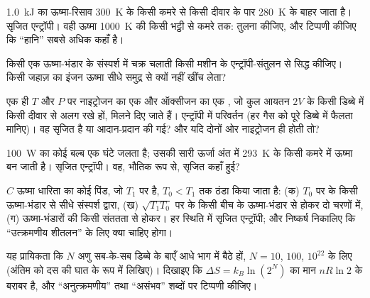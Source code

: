 \begin{exercise}[$\star\star$]\label{exo:b1:second-law-entropy:7}
\qty{1.0}{kJ} का ऊष्मा-रिसाव \qty{300}{K} के किसी कमरे से किसी दीवार के पार
\qty{280}{K} के बाहर जाता है। सृजित एन्ट्रॉपी। वही ऊष्मा \qty{1000}{K} की
किसी भट्ठी से कमरे तक: तुलना कीजिए, और टिप्पणी कीजिए कि ``हानि'' सबसे
अधिक कहाँ है।
\end{exercise}

\begin{exercise}[$\star\star$]\label{exo:b1:second-law-entropy:8}
किसी एक ऊष्मा-भंडार के संस्पर्श में चक्र चलाती किसी मशीन के एन्ट्रॉपी-संतुलन
से  सिद्ध कीजिए। किसी जहाज़ का इंजन ऊष्मा सीधे समुद्र से
क्यों नहीं खींच लेता?
\end{exercise}

\begin{exercise}[$\star\star$]\label{exo:b1:second-law-entropy:9}
एक ही $T$ और $P$ पर नाइट्रोजन का एक  और ऑक्सीजन का एक , जो कुल आयतन
$2V$ के किसी डिब्बे में किसी दीवार से अलग रखे हों, मिलने दिए जाते हैं।
एन्ट्रॉपी में परिवर्तन (हर गैस को पूरे डिब्बे में फैलता मानिए)। वह सृजित है
या आदान-प्रदान की गई? और यदि दोनों ओर नाइट्रोजन ही होती तो?
\end{exercise}

\begin{exercise}[$\star\star\star$]\label{exo:b1:second-law-entropy:10}
\qty{100}{W} का कोई बल्ब एक घंटे जलता है; उसकी सारी ऊर्जा अंत में
\qty{293}{K} के किसी कमरे में ऊष्मा बन जाती है। सृजित एन्ट्रॉपी। वह,
भौतिक रूप से, सृजित कहाँ हुई?
\end{exercise}

\begin{exercise}[$\star\star\star$]\label{exo:b1:second-law-entropy:11}
$C$ ऊष्मा धारिता का कोई पिंड, जो $T_1$ पर है, $T_0 < T_1$ तक ठंडा किया जाता
है: (क) $T_0$ पर के किसी ऊष्मा-भंडार से सीधे संस्पर्श द्वारा, (ख)
$\sqrt{T_1T_0}$ पर के किसी बीच के ऊष्मा-भंडार से होकर दो चरणों में, (ग)
ऊष्मा-भंडारों की किसी संततता से होकर। हर स्थिति में सृजित एन्ट्रॉपी; और
निष्कर्ष निकालिए कि ``उत्क्रमणीय शीतलन'' के लिए क्या चाहिए होगा।
\end{exercise}

\begin{exercise}[$\star\star\star$]\label{exo:b1:second-law-entropy:12}
यह प्रायिकता कि $N$ अणु सब-के-सब डिब्बे के बाएँ आधे भाग में बैठे हों,
$N = 10$, $100$, $10^{22}$ के लिए (अंतिम को दस की घात के रूप में लिखिए)।
दिखाइए कि $\Delta S = k_B\ln(2^N)$ का मान $nR\ln2$ के बराबर है, और
``अनुत्क्रमणीय'' तथा ``असंभव'' शब्दों पर टिप्पणी कीजिए।
\end{exercise}

